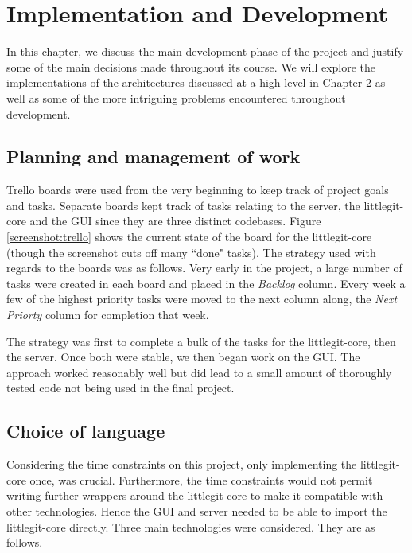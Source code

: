 \chapter{Implementation and Development}

In this chapter, we discuss the main development phase of the project and justify some of the main decisions made throughout its course. We will explore the implementations of the architectures discussed at a high level in Chapter 2 as well as some of the more intriguing problems encountered throughout development.


\section{Planning and management of work}


Trello boards were used from the very beginning to keep track of project goals and tasks. Separate boards kept track of tasks relating to the server, the littlegit-core and the GUI since they are three distinct codebases. Figure \ref{screenshot:trello} shows the current state of the board for the littlegit-core (though the screenshot cuts off many ``done" tasks). The strategy used with regards to the boards was as follows. Very early in the project, a large number of tasks were created in each board and placed in the \emph{Backlog} column. Every week a few of the highest priority tasks were moved to the next column along, the \emph{Next Priorty} column for completion that week. 


The strategy was first to complete a bulk of the tasks for the littlegit-core, then the server. Once both were stable, we then began work on the GUI. The approach worked reasonably well but did lead to a small amount of thoroughly tested code not being used in the final project.



\section{Choice of language}

Considering the time constraints on this project, only implementing the littlegit-core once, was crucial. Furthermore, the time constraints would not permit writing further wrappers around the littlegit-core to make it compatible with other technologies. Hence the GUI and server needed to be able to import the littlegit-core directly. Three main technologies were considered. They are as follows.

